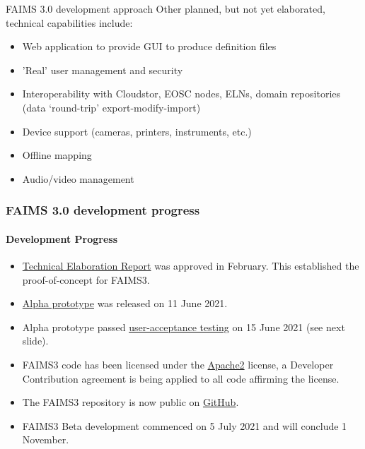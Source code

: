 \documentclass[aspectratio=169, 12pt]{beamer} %
\begin{document}
\begin{frame}{FAIMS 3.0 development approach}
Other planned, but not yet elaborated, technical capabilities include:
    \begin{itemize}[label=\textbullet]
        \item Web application to provide GUI to produce definition files
        \item 'Real' user management and security
        \item Interoperability with Cloudstor, EOSC nodes, ELNs, domain repositories (data `round-trip' export-modify-import)
        \item Device support (cameras, printers, instruments, etc.)
        \item Offline mapping
        \item Audio/video management
    \end{itemize}
\end{frame}

\begin{frame}
    \frametitle{FAIMS 3.0 development progress}
    \framesubtitle{Development Progress}        
        \begin{itemize}[label=\textbullet]
            \item \href{https://docs.google.com/document/d/13eTN8jhJa3Pgs9GOdo7r4jtIQcskNo7ikxJcBDBKHzw/edit}{Technical Elaboration Report} was approved in February. This established the proof-of-concept for FAIMS3. 
          \item \href{https://github.com/FAIMS/FAIMS3/releases/tag/v0.1.0-alpha}{Alpha prototype} was released on 11 June 2021.  
          \item Alpha prototype passed \href{https://doi.org/10.5281/zenodo.5030772}{user-acceptance testing} on 15 June 2021 (see next slide).
        \item FAIMS3 code has been licensed under the \href{https://www.apache.org/licenses/LICENSE-2.0}{Apache2} license, a Developer Contribution agreement is being applied to all code affirming the license. 
        \item The FAIMS3 repository is now public on \href{https://github.com/FAIMS/FAIMS3}{GitHub}.
        \item FAIMS3 Beta development commenced on 5 July 2021 and will conclude 1 November. 

    \end{itemize}



\end{frame} 
\end{document}
